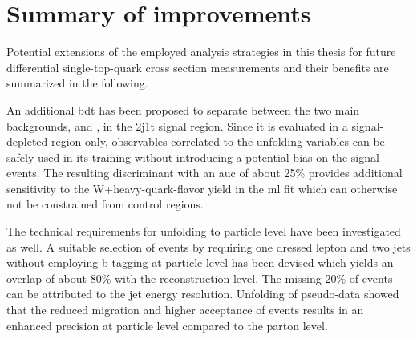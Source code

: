 {\hspace{0.02\textwidth}
}


\section{Summary of improvements}

Potential extensions of the employed analysis strategies in this thesis for future differential single-top-quark cross section measurements and their benefits are summarized in the following.

An additional \gls{bdt} has been proposed to separate between the two main backgrounds, \wjets and \ttbar, in the 2j1t signal region. Since it is evaluated in a signal-depleted region only, observables correlated to the unfolding variables can be safely used in its training without introducing a potential bias on the signal events. The resulting discriminant with an \gls{auc} of about 25\% provides additional sensitivity to the W+heavy-quark-flavor yield in the \gls{ml} fit which can otherwise not be constrained from control regions.

The technical requirements for unfolding to particle level have been investigated as well. A suitable selection of events by requiring one dressed lepton and two jets without employing b-tagging at particle level has been devised which yields an overlap of about 80\% with the reconstruction level. The missing 20\% of events can be attributed to the jet energy resolution. Unfolding of pseudo-data showed that the reduced migration and higher acceptance of events results in an enhanced precision at particle level compared to the parton level.